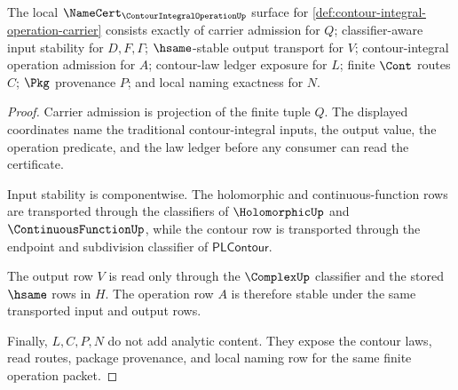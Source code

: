 \begin{theorem}
\label{thm:contour-integral-operation-namecert-obligations}
The local $\NameCert_{\ContourIntegralOperationUp}$ surface for \autoref{def:contour-integral-operation-carrier} consists exactly of carrier admission for $Q$; classifier-aware input stability for $D,F,\Gamma$; $\hsame$-stable output transport for $V$; contour-integral operation admission for $A$; contour-law ledger exposure for $L$; finite $\Cont$ routes $C$; $\Pkg$ provenance $P$; and local naming exactness for $N$.
\end{theorem}
\begin{proof}
Carrier admission is projection of the finite tuple $Q$. The displayed coordinates name the traditional contour-integral inputs, the output value, the operation predicate, and the law ledger before any consumer can read the certificate.

Input stability is componentwise. The holomorphic and continuous-function rows are transported through the classifiers of $\HolomorphicUp$ and $\ContinuousFunctionUp$, while the contour row is transported through the endpoint and subdivision classifier of $\mathsf{PLContour}$.

The output row $V$ is read only through the $\ComplexUp$ classifier and the stored $\hsame$ rows in $H$. The operation row $A$ is therefore stable under the same transported input and output rows.

Finally, $L,C,P,N$ do not add analytic content. They expose the contour laws, read routes, package provenance, and local naming row for the same finite operation packet.
\end{proof}

